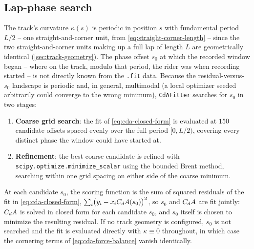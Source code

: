 \subsection{Lap-phase search}
\label{sec:cda-s0-search}

The track's curvature $\kappa(s)$ is periodic in position $s$ with fundamental
period $L/2$ -- one straight-and-corner unit, from
\cref{eq:straight-corner-length} -- since the two straight-and-corner units
making up a full lap of length $L$ are geometrically identical
(\cref{sec:track-geometry}). The phase offset $s_0$ at which the recorded
window began -- where on the track, modulo that period, the rider was when
recording started -- is not directly known from the \nolinkurl{.fit} data. Because
the residual-versus-$s_0$ landscape is periodic and, in general, multimodal (a
local optimizer seeded arbitrarily could converge to the wrong minimum),
\nolinkurl{CdAFitter} searches for $s_0$ in two stages:

\begin{enumerate}
    \item \textbf{Coarse grid search}: the fit of
    \cref{eq:cda-closed-form} is evaluated at $150$ candidate offsets spaced
    evenly over the full period $[0, L/2)$, covering every distinct phase the
    window could have started at.

    \item \textbf{Refinement}: the best coarse candidate is refined with
    \nolinkurl{scipy.optimize.minimize_scalar} using the bounded Brent method,
    searching within one grid spacing on either side of the coarse minimum.
\end{enumerate}
At each candidate $s_0$, the scoring function is the sum of squared residuals of
the fit in \cref{eq:cda-closed-form},
$\sum_i \bigl(y_i - x_i C_{d}A(s_0)\bigr)^2$, so $s_0$ and $C_{d}A$ are fit jointly:
$C_{d}A$ is solved in closed form for each candidate $s_0$, and $s_0$ itself is
chosen to minimize the resulting residual. If no track geometry is configured,
$s_0$ is not searched and the fit is evaluated directly with $\kappa \equiv 0$
throughout, in which case the cornering terms of
\cref{eq:cda-force-balance} vanish identically.
